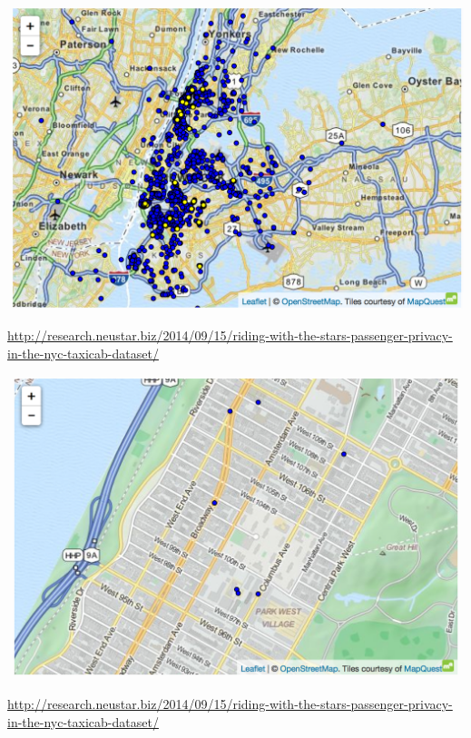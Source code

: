\documentclass{beamer}
\begin{document}
\begin{frame}

\begin{center}
\includegraphics[width=1.1\textwidth]{figures/hustler_dropoff_wide.png}
\end{center}

\tiny{\url{http://research.neustar.biz/2014/09/15/riding-with-the-stars-passenger-privacy-in-the-nyc-taxicab-dataset/}}
\end{frame}
\begin{frame}

\begin{center}
\includegraphics[width=\textwidth]{figures/hustler_dropoff_uws.png}
\end{center}

\tiny{\url{http://research.neustar.biz/2014/09/15/riding-with-the-stars-passenger-privacy-in-the-nyc-taxicab-dataset/}}
\end{frame}
\end{document}
